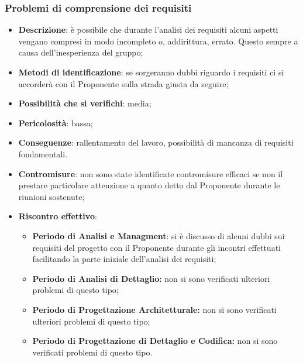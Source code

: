 		\subsubsection{Problemi di comprensione dei requisiti}
		\begin{itemize}
			\item \textbf{Descrizione}: è possibile che durante l'analisi dei requisiti alcuni aspetti vengano compresi in modo incompleto o, addirittura, errato. Questo sempre a causa dell'inesperienza del gruppo;
			\item \textbf{Metodi di identificazione}: se sorgeranno dubbi riguardo i requisiti ci si accorderà con il Proponente sulla strada giusta da seguire;
			\item \textbf{Possibilità che si verifichi}: media;
			\item \textbf{Pericolosità}: bassa;
			\item \textbf{Conseguenze}: rallentamento del lavoro, possibilità di mancanza di requisiti fondamentali.
			\item \textbf{Contromisure}: non sono state identificate contromisure efficaci se non il prestare particolare attenzione a quanto detto dal Proponente durante le riunioni sostenute;
			\item \textbf{Riscontro effettivo}:
			\begin{itemize}
				\item \textbf{Periodo di Analisi e Managment}: si è discusso di alcuni dubbi sui requisiti del progetto con il Proponente durante gli incontri effettuati facilitando la parte iniziale dell'analisi dei requisiti;
				\item \textbf{Periodo di Analisi di Dettaglio:} non si sono verificati ulteriori problemi di questo tipo;
				\item \textbf{Periodo di Progettazione Architetturale:} non si sono verificati ulteriori problemi di questo tipo;
            \item \textbf{Periodo di Progettazione di Dettaglio e Codifica:} non si sono verificati problemi di questo tipo.
			\end{itemize}
		\end{itemize}

